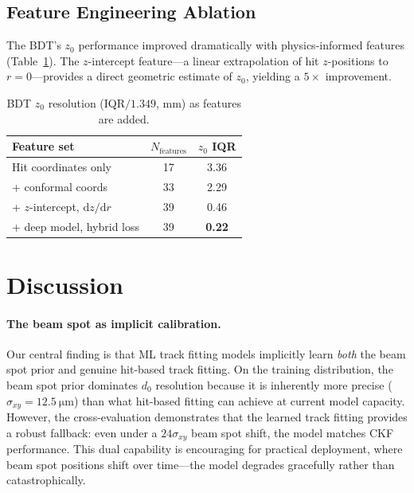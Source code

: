 \documentclass[11pt]{article}
\begin{document}
\subsection{Feature Engineering Ablation}

The BDT's $z_0$ performance improved dramatically with physics-informed features (Table~\ref{tab:ablation}).
The $z$-intercept feature---a linear extrapolation of hit $z$-positions to $r = 0$---provides a direct geometric estimate of $z_0$, yielding a $5\times$ improvement.

\begin{table}[h]
\centering
\caption{BDT $z_0$ resolution (IQR$/1.349$, mm) as features are added.}
\label{tab:ablation}
\begin{tabular}{lcc}
\toprule
Feature set & $N_\text{features}$ & $z_0$ IQR \\
\midrule
Hit coordinates only & 17 & 3.36 \\
\quad + conformal coords & 33 & 2.29 \\
\quad + $z$-intercept, $\mathrm{d}z/\mathrm{d}r$ & 39 & 0.46 \\
\quad + deep model, hybrid loss & 39 & \textbf{0.22} \\
\bottomrule
\end{tabular}
\end{table}


\section{Discussion}
\label{sec:discussion}

\paragraph{The beam spot as implicit calibration.}
Our central finding is that ML track fitting models implicitly learn \emph{both} the beam spot prior and genuine hit-based track fitting.
On the training distribution, the beam spot prior dominates $d_0$ resolution because it is inherently more precise ($\sigma_{xy} = \SI{12.5}{\micro\metre}$) than what hit-based fitting can achieve at current model capacity.
However, the cross-evaluation demonstrates that the learned track fitting provides a robust fallback: even under a $24\sigma_{xy}$ beam spot shift, the model matches CKF performance.
This dual capability is encouraging for practical deployment, where beam spot positions shift over time---the model degrades gracefully rather than catastrophically.
\end{document}
